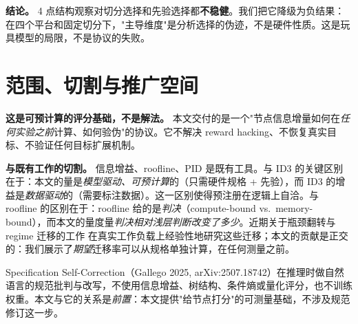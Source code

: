 \documentclass[10pt]{article}
\begin{document}
\textbf{结论。} 4 点结构观察对切分选择和先验选择都\textbf{不稳健}。我们把它降级为负结果：在四个平台和固定切分下，"主导维度"是分析选择的伪迹，不是硬件性质。这是玩具模型的局限，不是协议的失败。

\section{范围、切割与推广空间}\label{scope-differentiation-and-extension-space}

\textbf{这是可预计算的评分基础，不是解法。} 本文交付的是一个"节点信息增量如何在\emph{任何实验之前}计算、如何验伪"的协议。它不解决 reward hacking、不恢复真实目标、不验证任何目标扩展机制。

\textbf{与既有工作的切割。} 信息增益、roofline、PID 是既有工具。与 ID3 的关键区别在于：本文的量是\emph{模型驱动、可预计算}的（只需硬件规格 + 先验），而 ID3 的增益是\emph{数据驱动}的（需要标注数据）。这一区别使得预注册在逻辑上自洽。与 roofline \citep{roofline2009} 的区别在于：roofline 给的是\emph{判决}（compute-bound vs.\ memory-bound），而本文的量度量\emph{判决相对浅层判断改变了多少}。近期关于瓶颈翻转与 regime 迁移的工作 \citep{memoryWallFlip2026,memoryGap2025,saScheduler2026} 在真实工作负载上经验性地研究这些迁移；本文的贡献是正交的：我们展示了\emph{期望}迁移率可以从规格单独计算，在任何测量之前。

Specification Self-Correction（Gallego 2025, arXiv:2507.18742）在推理时做自然语言的规范批判与改写，不使用信息增益、树结构、条件熵或量化评分，也不训练权重。本文与它的关系是\emph{前置}：本文提供"给节点打分"的可测量基础，不涉及规范修订这一步。
\end{document}
